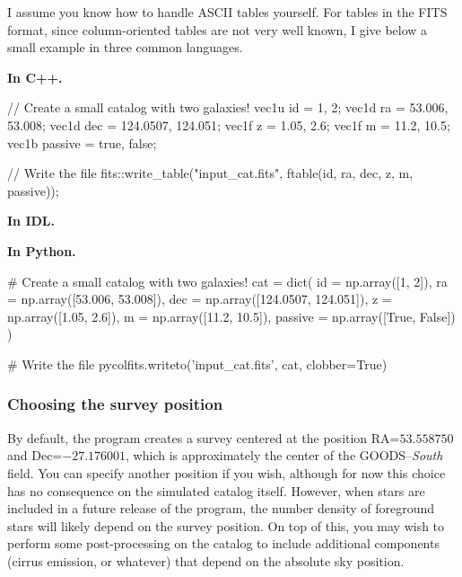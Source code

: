 \documentclass[12pt,a4paper]{article}
\begin{document}
I assume you know how to handle ASCII tables yourself. For tables in the FITS format, since column-oriented tables are not very well known, I give below a small example in three common languages.

{\bf In C++.}
\begin{cppcode}
// Create a small catalog with two galaxies!
vec1u id      = {1,        2};
vec1d ra      = {53.006,   53.008};
vec1d dec     = {124.0507, 124.051};
vec1f z       = {1.05,     2.6};
vec1f m       = {11.2,     10.5};
vec1b passive = {true,     false};

// Write the file
fits::write_table("input_cat.fits", ftable(id, ra, dec, z, m, passive));
\end{cppcode}

{\bf In IDL.}

{\bf In Python.}
\begin{pythoncode}
# Create a small catalog with two galaxies!
cat = dict(
    id      = np.array([1,        2]),
    ra      = np.array([53.006,   53.008]),
    dec     = np.array([124.0507, 124.051]),
    z       = np.array([1.05,     2.6]),
    m       = np.array([11.2,     10.5]),
    passive = np.array([True,     False])
)

# Write the file
pycolfits.writeto('input_cat.fits', cat, clobber=True)
\end{pythoncode}


\subsubsection{Choosing the survey position}

By default, the program creates a survey centered at the position RA=$53.558750$ and Dec=$-27.176001$, which is approximately the center of the GOODS--{\it South} field. You can specify another position if you wish, although for now this choice has no consequence on the simulated catalog itself. However, when stars are included in a future release of the program, the number density of foreground stars will likely depend on the survey position. On top of this, you may wish to perform some post-processing on the catalog to include additional components (cirrus emission, or whatever) that depend on the absolute sky position.
\end{document}

